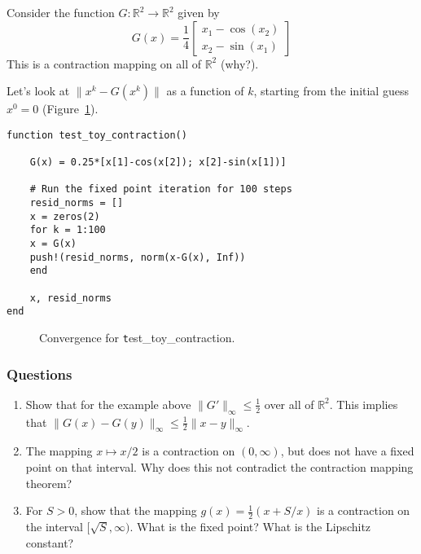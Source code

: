 \documentclass[12pt, leqno]{article} %
\begin{document}
Consider the function \(G : \mathbb{R}^2 \rightarrow \mathbb{R}^2\)
given by
\[G(x) = \frac{1}{4} \begin{bmatrix} x_1-\cos(x_2) \\ x_2-\sin(x_1) \end{bmatrix}\]
This is a contraction mapping on all of \(\mathbb{R}^2\) (why?).

Let's look at $\|x^k-G(x^k)\|$ as a function of $k$, starting from the
initial guess $x^0 = 0$ (Figure~\ref{fig:toy-contraction-cvg}).

\begin{verbatim}
function test_toy_contraction()
	
    G(x) = 0.25*[x[1]-cos(x[2]); x[2]-sin(x[1])]
    
    # Run the fixed point iteration for 100 steps
    resid_norms = []
    x = zeros(2)
    for k = 1:100
	x = G(x)
	push!(resid_norms, norm(x-G(x), Inf))
    end
    
    x, resid_norms
end
\end{verbatim}

\begin{figure}
\caption{Convergence for {\texttt test\_toy\_contraction}.}
\label{fig:toy-contraction-cvg}
\end{figure}

\subsubsection{Questions}

\begin{enumerate}
\def\labelenumi{\arabic{enumi}.}
\item
  Show that for the example above \(\|G'\|_\infty \leq \frac{1}{2}\)
  over all of \(\mathbb{R}^2\). This implies that
  \(\|G(x)-G(y)\|_\infty \leq \frac{1}{2} \|x-y\|_\infty\).
\item
  The mapping \(x \mapsto x/2\) is a contraction on \((0, \infty)\), but
  does not have a fixed point on that interval. Why does this not
  contradict the contraction mapping theorem?
\item
  For \(S > 0\), show that the mapping \(g(x) = \frac{1}{2} (x + S/x)\)
  is a contraction on the interval \([\sqrt{S}, \infty)\). What is the
  fixed point? What is the Lipschitz constant?
\end{enumerate}
\end{document}
